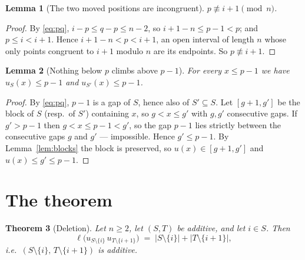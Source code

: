 \documentclass[11pt]{article}
\newtheorem{thm}{Theorem}[section]
\newtheorem{lem}[thm]{Lemma}
\theoremstyle{definition}
\begin{document}
\begin{lem}[The two moved positions are incongruent]\label{lem:incong}
$p\not\equiv i+1 \pmod n$.
\end{lem}

\begin{proof}
By \eqref{eq:pq}, $i-p\le q-p\le n-2$, so $i+1-n\le p-1<p$; and $p\le i<i+1$. Hence
$i+1-n<p<i+1$, an open interval of length $n$ whose only points congruent to $i+1$ modulo $n$
are its endpoints. So $p\not\equiv i+1$.
\end{proof}

\begin{lem}[Nothing below $p$ climbs above $p-1$]\label{lem:below}
For every $x\le p-1$ we have $u_S(x)\le p-1$ and $u_{S'}(x)\le p-1$.
\end{lem}

\begin{proof}
By \eqref{eq:pq}, $p-1$ is a gap of $S$, hence also of $S'\subseteq S$. Let $[g+1,g']$ be the
block of $S$ (resp.\ of $S'$) containing $x$, so $g<x\le g'$ with $g,g'$ consecutive gaps. If
$g'>p-1$ then $g<x\le p-1<g'$, so the gap $p-1$ lies strictly between the consecutive gaps $g$
and $g'$ --- impossible. Hence $g'\le p-1$. By Lemma~\ref{lem:blocks} the block is preserved,
so $u(x)\in[g+1,g']$ and $u(x)\le g'\le p-1$.
\end{proof}

\section{The theorem}\label{sec:thm}

\begin{thm}[Deletion]\label{thm:main}
Let $n\ge2$, let $(S,T)$ be additive, and let $i\in S$. Then
\[
  \ell\bigl(u_{S\setminus\{i\}}\,u_{T\setminus\{i+1\}}\bigr)
  \;=\;\bigl|S\setminus\{i\}\bigr|+\bigl|T\setminus\{i+1\}\bigr| ,
\]
i.e.\ $(S\setminus\{i\},\,T\setminus\{i+1\})$ is additive.
\end{thm}
\end{document}
